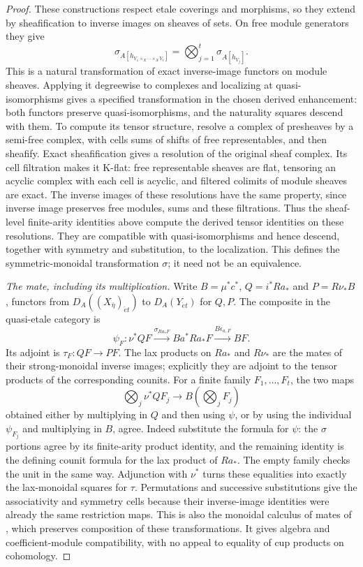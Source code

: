 \documentclass[11pt]{article}
\theoremstyle{definition}
\theoremstyle{remark}
\begin{document}
\begin{proof}
These constructions respect etale coverings and morphisms, so they
extend by sheafification to inverse images on sheaves of sets.
On free module generators they give
\[
 \sigma_{A[h_{V_1\times_X\cdots\times_XV_t}]}
           =\bigotimes_{j=1}^t\sigma_{A[h_{V_j}]}.
\]
This is a natural transformation of exact inverse-image functors
on module sheaves.  Applying it degreewise to complexes and localizing
at quasi-isomorphisms gives a specified transformation in the chosen
derived enhancement: both functors preserve quasi-isomorphisms, and
the naturality squares descend with them.
To compute its tensor structure, resolve a complex of presheaves by
a semi-free complex, with cells sums of shifts of free representables,
and then sheafify.  Exact sheafification gives a resolution of the
original sheaf complex.  Its cell filtration makes it K-flat: free
representable sheaves are flat, tensoring an acyclic complex with
each cell is acyclic, and filtered colimits of module sheaves are exact.
The inverse images of these resolutions have the same property,
since inverse image preserves free modules, sums and these filtrations.
Thus the sheaf-level finite-arity identities above compute the derived
tensor identities on these resolutions.  They are compatible with
quasi-isomorphisms and hence descend, together with symmetry and
substitution, to the localization.  This defines the symmetric-monoidal
transformation $\sigma$; it need not be an equivalence.

\emph{The mate, including its multiplication.}
Write $B=\mu^*c^*$, $Q=i^*Ra_*$ and $P=R\nu_*B$, functors from
$D_A((X_{\bar\eta})_{\acute et})$ to $D_A(Y_{\acute et})$ for $Q,P$.
The composite in the quasi-etale category is
\[
 \psi_F:\nu^*QF\xrightarrow{\sigma_{Ra_*F}}
           B a^*Ra_*F\xrightarrow{B\epsilon_{a,F}}BF.
\]
Its adjoint is $\tau_F:QF\to PF$.
The lax products on $Ra_*$ and $R\nu_*$ are the mates of their
strong-monoidal inverse images; explicitly they are adjoint to
the tensor products of the corresponding counits.
For a finite family $F_1,\ldots,F_t$, the two maps
\[
 \bigotimes_j\nu^*QF_j\longrightarrow B(\bigotimes_jF_j)
\]
obtained either by multiplying in $Q$ and then using $\psi$, or by
using the individual $\psi_{F_j}$ and multiplying in $B$, agree.
Indeed substitute the formula for $\psi$: the $\sigma$ portions
agree by its finite-arity product identity, and the remaining
identity is the defining counit formula for the lax product of
$Ra_*$.  The empty family checks the unit in the same way.
Adjunction with $\nu^*$ turns these equalities into exactly the
lax-monoidal squares for $\tau$.  Permutations and successive
substitutions give the associativity and symmetry cells because
their inverse-image identities were already the same restriction
maps.  This is also the monoidal calculus of mates of
\cite[Theorem 3.4.7]{HHLNMates}, which preserves composition of
these transformations.  It gives algebra and coefficient-module
compatibility, with no appeal to equality of cup products on cohomology.


\end{proof}
\end{document}

